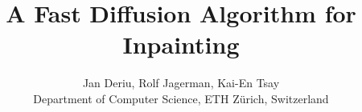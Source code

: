 \documentclass[10pt,conference,compsocconf]{IEEEtran}
\begin{document}
\title{A Fast Diffusion Algorithm for Inpainting}

\author{
  Jan Deriu, Rolf Jagerman, Kai-En Tsay\\
  Department of Computer Science, ETH Zürich, Switzerland
}

\maketitle
















\end{document}

